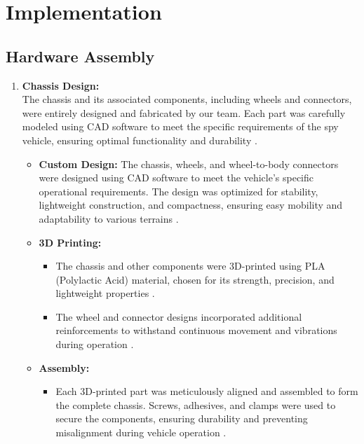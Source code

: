 \documentclass[12pt,a4paper]{report}
\begin{document}
	\section{Implementation}
\label{Hardware Assembly}
\subsection{Hardware Assembly}

\begin{enumerate}
    \item \textbf{Chassis Design:} \\
     The chassis and its associated components, including wheels and connectors, were entirely designed and fabricated by our team. Each part was carefully modeled using CAD software to meet the specific requirements of the spy vehicle, ensuring optimal functionality and durability \cite{3dprinting, circuitdesign}.
    \begin{itemize}

        \item \textbf{Custom Design:} The chassis, wheels, and wheel-to-body connectors were designed using CAD software to meet the vehicle’s specific operational requirements. The design was optimized for stability, lightweight construction, and compactness, ensuring easy mobility and adaptability to various terrains \cite{circuitdesign}.
        \item \textbf{3D Printing:} 
        \begin{itemize}
            \item The chassis and other components were 3D-printed using PLA (Polylactic Acid) material, chosen for its strength, precision, and lightweight properties \cite{3dprinting}.
            \item The wheel and connector designs incorporated additional reinforcements to withstand continuous movement and vibrations during operation \cite{3dprinting}.
        \end{itemize}
        \item \textbf{Assembly:} 
        \begin{itemize}
            \item Each 3D-printed part was meticulously aligned and assembled to form the complete chassis. Screws, adhesives, and clamps were used to secure the components, ensuring durability and preventing misalignment during vehicle operation \cite{3dprinting}.
        \end{itemize}
        

\end{itemize}
\end{enumerate}
\end{document}
